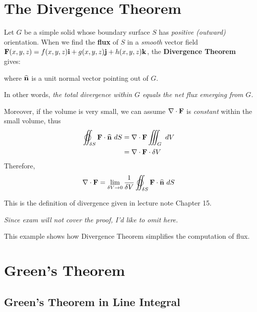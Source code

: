 
\begin{spacing}{1.3}

    \section{The Divergence Theorem}

    Let $G$ be a simple solid whose boundary surface $S$ has {\it positive (outward)} orientation.
    When we find the {\bf flux} of $S$ in a {\it smooth} vector field
    ${\bf F}(x,y,z)=f(x,y,z){\bf i} + g(x,y,z){\bf j} +h(x,y,z){\bf k}$, 
    the {\bf Divergence Theorem} gives:
    \begin{center}
    \end{center}
    where $\widehat{\bf n}$ is a unit normal vector pointing out of $G$.

    In other words, {\it the total divergence within $G$ equals the net flux emerging from $G$.}

    \vspace{0.2in}
    Moreover, if the volume is very small, we can assume $\nabla\cdot {\bf F}$ is {\it constant} within 
    the small volume, thus 
    \begin{align*}
        \varoiint_{\delta S}\FF\cdot \nm \ dS &= \nabla \cdot \FF \iiint_{G}\ dV \\
        &= \nabla\cdot \FF \cdot \delta V
    \end{align*}
    Therefore, $$\nabla\cdot \FF =\lim_{\delta V\rightarrow 0} \frac{1}{\delta V}
    \varoiint_{\delta S} \FF\cdot \nm \ dS$$

    This is the definition of divergence given in lecture note Chapter 15.

    \vspace{0.2in}
    {\it Since exam will not cover the proof, I'd like to omit here.}
    {\Large {}}


    \newpage
    {\blue This example shows how Divergence Theorem simplifies the computation of flux.}



    \newpage
    \section{Green's Theorem}
    \subsection{Green's Theorem in Line Integral}


\end{spacing}
